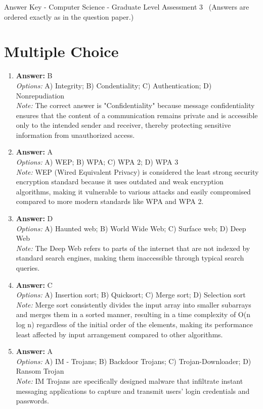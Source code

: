 \documentclass[12pt]{article}
\begin{document}
\begin{center}
Answer Key - Computer Science - Graduate Level Assessment 3 \
\small (Answers are ordered exactly as in the question paper.)
\end{center}

\section*{Multiple Choice}
\begin{enumerate}[label=\arabic*.]
\item \textbf{Answer:} B
\\ \textit{Options:} A) Integrity; B) Condentiality; C) Authentication; D) Nonrepudiation
\\ \textit{Note:} The correct answer is "Confidentiality" because message confidentiality ensures that the content of a communication remains private and is accessible only to the intended sender and receiver, thereby protecting sensitive information from unauthorized access.
\item \textbf{Answer:} A
\\ \textit{Options:} A) WEP; B) WPA; C) WPA 2; D) WPA 3
\\ \textit{Note:} WEP (Wired Equivalent Privacy) is considered the least strong security encryption standard because it uses outdated and weak encryption algorithms, making it vulnerable to various attacks and easily compromised compared to more modern standards like WPA and WPA 2.
\item \textbf{Answer:} D
\\ \textit{Options:} A) Haunted web; B) World Wide Web; C) Surface web; D) Deep Web
\\ \textit{Note:} The Deep Web refers to parts of the internet that are not indexed by standard search engines, making them inaccessible through typical search queries.
\item \textbf{Answer:} C
\\ \textit{Options:} A) Insertion sort; B) Quicksort; C) Merge sort; D) Selection sort
\\ \textit{Note:} Merge sort consistently divides the input array into smaller subarrays and merges them in a sorted manner, resulting in a time complexity of O(n log n) regardless of the initial order of the elements, making its performance least affected by input arrangement compared to other algorithms.
\item \textbf{Answer:} A
\\ \textit{Options:} A) IM - Trojans; B) Backdoor Trojans; C) Trojan-Downloader; D) Ransom Trojan
\\ \textit{Note:} IM Trojans are specifically designed malware that infiltrate instant messaging applications to capture and transmit users' login credentials and passwords.
\end{enumerate}
\end{document}
